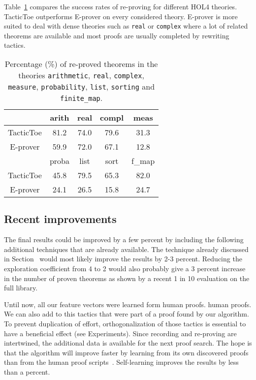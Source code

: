 \documentclass[runningheads,a4paper,draft]{svjour3}
\def\holfour{\textsf{HOL4}\xspace}
\def\eprover{\textsf{E-prover}\xspace}
\def\tactictoe{\textsf{TacticToe}\xspace}
\begin{document}
Table~\ref{theories} compares the success rates of re-proving for different
\holfour theories. \tactictoe outperforms \eprover on every 
considered theory.
\eprover is more suited to deal with dense theories such as 
\texttt{real} or \texttt{complex} where a lot of related theorems are available 
and most proofs are usually completed by rewriting tactics.

\begin{table}[]
\centering
\setlength{\tabcolsep}{3mm}
\begin{tabular}{@{}ccccc@{}}
\toprule
\phantom{ab} & {arith} & {real} & {compl} & {meas} \\
\midrule
\tactictoe & 81.2 & 74.0 & 79.6 & 31.3\\
\eprover & 59.9 & 72.0 & 67.1 & 12.8\\
\midrule
\phantom{abc} & {proba} & {list} & {sort} & {f\_map} \\
\midrule
\tactictoe & 45.8 & 79.5 & 65.3 & 82.0 \\
\eprover & 24.1 & 26.5 & 15.8 & 24.7 \\
\bottomrule
\end{tabular}
\caption{\label{theories}Percentage (\%) of re-proved theorems in the theories 
\texttt{arithmetic}, \texttt{real}, \texttt{complex}, \texttt{measure},  
\texttt{probability}, \texttt{list}, \texttt{sorting} and \texttt{finite\_map}. 
}
\end{table}  



\subsection{Recent improvements}
The final results could be improved by a few percent by including the 
following additional techniques that are already available.
The technique already discussed in Section~ would most likely improve the 
results by 2-3 percent. Reducing the exploration coefficient from 4 to 2 would 
also probably give a 3 percent increase in the number of proven theorems as 
shown by a recent 1 in 10 evaluation on the full library.

Until now, all our feature vectors were learned form human proofs. 
human proofs. We can also add to this tactics that were part of a proof found 
by our algorithm. To prevent duplication of effort, orthogonalization of those 
tactics is essential to have a beneficial effect (see Experiments).
Since recording and re-proving are intertwined, the 
additional data is available for the next proof search.
The hope is that the algorithm will improve faster by learning from its own 
discovered proofs than from the human proof 
scripts~\cite{DBLP:conf/cade/Urban07}. 
Self-learning improves the results by 
less than a percent.
\end{document}
